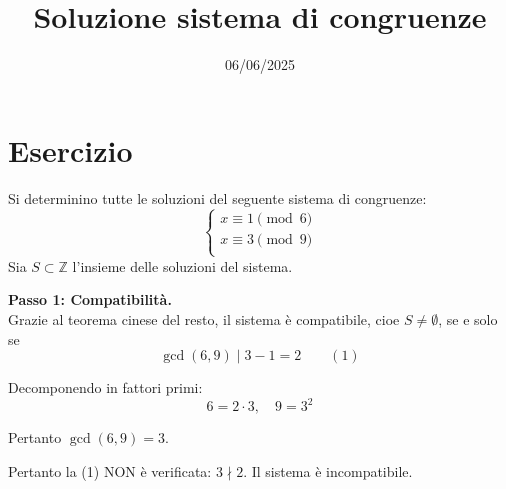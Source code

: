 \documentclass[12pt]{article}
\begin{document}
\title{Soluzione sistema di congruenze}
\date{06/06/2025}
\maketitle
\section*{Esercizio}
Si determinino tutte le soluzioni del seguente sistema di congruenze:
\[
\begin{cases}
x \equiv 1 \pmod{6} \\
x \equiv 3 \pmod{9} \\
\end{cases}
\]
Sia $S \subset \mathbb{Z}$ l'insieme delle soluzioni del sistema.

\textbf{Passo 1: Compatibilità.} \\ 
Grazie al teorema cinese del resto, il sistema è compatibile, cioe $S \neq \emptyset$, se e solo se
$$\gcd(6, 9) \mid 3 - 1 = 2 \qquad (1)$$

Decomponendo in fattori primi:
$$6 = 2 \cdot 3, \quad 9 = 3^{2}$$

Pertanto $\gcd(6, 9) = 3$.

Pertanto la (1) NON è verificata: $3 \nmid 2$. Il sistema è incompatibile.\\
\end{document}
